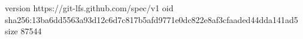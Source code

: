 version https://git-lfs.github.com/spec/v1
oid sha256:13ba6dd5563a93d12c6d7c817b5afd9771e0dc822e8af3cfaaded44dda141ad5
size 87544
